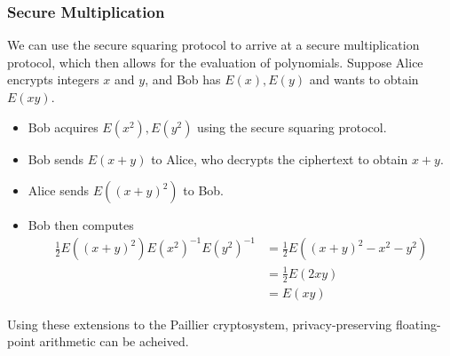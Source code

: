 \subsubsection{Secure Multiplication}
We can use the secure squaring protocol to arrive at a secure multiplication protocol, which then allows for the evaluation of polynomials.
Suppose Alice encrypts integers $x$ and $y$, and Bob has $E(x), E(y)$ and wants to obtain $E(xy)$.
\begin{itemize}
	\item Bob acquires $E(x^2), E(y^2)$ using the secure squaring protocol.
	\item Bob sends $E(x+y)$ to Alice, who decrypts the ciphertext to obtain $x+y$.
	\item Alice sends $E((x+y)^2)$ to Bob.
	\item Bob then computes
	\begin{align*}
		\frac{1}{2}E((x+y)^2)E(x^2)^{-1}E(y^2)^{-1} &= \frac{1}{2}E((x+y)^2 - x^2 - y^2)\\
		&= \frac{1}{2}E(2xy)\\
		&= E(xy)
	\end{align*}
\end{itemize}

Using these extensions to the Paillier cryptosystem, privacy-preserving floating-point arithmetic can be acheived.
